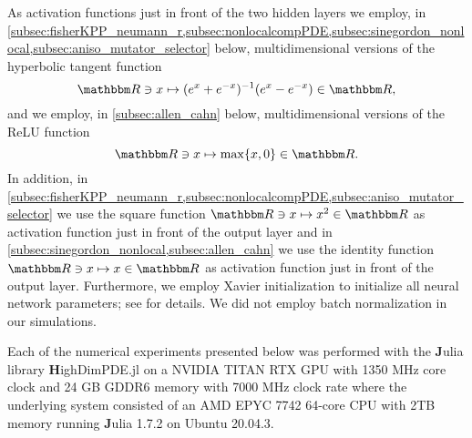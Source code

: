 As activation functions just in front of the two hidden layers we employ, in \cref{subsec:fisherKPP_neumann_r,subsec:nonlocalcompPDE,subsec:sinegordon_nonlocal,subsec:aniso_mutator_selector} below, multidimensional versions of the hyperbolic tangent function
\begin{equation}
	\R \ni x \mapsto (e^x + e^{-x})^{-1} (e^{x} - e^{-x}) \in \R,
\end{equation}
and we employ, in \cref{subsec:allen_cahn} below, multidimensional versions of the ReLU function
\begin{equation}
	\R\ni x\mapsto \max\{x,0\}\in\R.
\end{equation}
In addition, in \cref{subsec:fisherKPP_neumann_r,subsec:nonlocalcompPDE,subsec:aniso_mutator_selector} we use the square function 
$
\R \ni x \mapsto x^2 \in \R
$
as activation function just in front of the output layer and in \cref{subsec:sinegordon_nonlocal,subsec:allen_cahn} we use the identity function 
$
\R \ni x \mapsto x \in \R
$
as activation function just in front of the output layer.
Furthermore, we employ Xavier initialization to initialize all neural network parameters; see \cite{glorot2010} for details. We did not employ batch normalization in our simulations.
%
%

Each of the numerical experiments presented below was performed with the {\textbf Julia} library {\textbf HighDimPDE.jl} on a NVIDIA TITAN RTX GPU with 1350 MHz core clock and 24 GB GDDR6 memory with 7000 MHz clock rate where the underlying system consisted of an AMD EPYC 7742 64-core CPU with 2TB memory running {\textbf Julia} 1.7.2 on Ubuntu 20.04.3.


